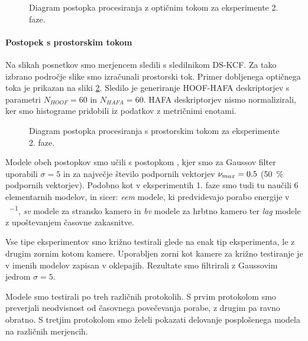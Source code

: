 \begin{figure}[htb]
	\centering
	
	\caption{Diagram postopka procesiranja z optičnim tokom za eksperimente 2. faze.}
	\label{fig:diagram-procesiranja-of-stage2}
\end{figure}

\paragraph{Postopek s prostorskim tokom}
Na slikah posnetkov smo merjencem sledili s sledilnikom DS-KCF. Za tako izbrano področje slike smo izračunali prostorski tok. Primer dobljenega optičnega toka je prikazan na sliki \ref{fig:prostorski-tok-stage2}. Sledilo je generiranje HOOF-HAFA deskriptorjev s parametri $N_{HOOF} = 60$ in $N_{HAFA} = 60$. HAFA deskriptorjev  nismo normalizirali, ker smo histograme pridobili iz podatkov z metričnimi enotami. 

\begin{figure}[htb]
	\label{fig:prostorski-tok-stage2}
\end{figure}

\begin{figure}[htb]
	\centering
	
	\caption{Diagram postopka procesiranja s prostorskim tokom za eksperimente 2. faze.}
	\label{fig:diagram-procesiranja-sf-stage2}
\end{figure}
 
Modele obeh postopkov smo učili s postopkom \nurbf, kjer smo za Gaussov filter uporabili $\sigma=5$ in za največje število podpornih vektorjev $\nu_{max} =0.5$ (\SI{50}{\%} podpornih vektorjev). Podobno kot v eksperimentih 1. faze smo tudi tu naučili \num{6} elementarnih modelov, in sicer: \textit{eem} modele, ki predvidevajo porabo energije v \si{\kcal\per\min}, \textit{sv} modele za stransko kamero in \textit{bv} modele za hrbtno kamero ter \textit{lag} modele z upoštevanjem časovne zakasnitve.

Vse tipe eksperimentov smo križno testirali glede na enak tip eksperimenta, le z drugim zornim kotom kamere. Uporabljen zorni kot kamere za križno testiranje je v imenih modelov zapisan v oklepajih.  Rezultate smo filtrirali z Gaussovim jedrom $\sigma=5$. 

Modele smo testirali po treh različnih protokolih. S prvim protokolom smo preverjali neodvisnost od časovnega povečevanja porabe, z drugim pa ravno obratno. S tretjim protokolom smo želeli pokazati delovanje posplošenega modela na različnih merjencih.


